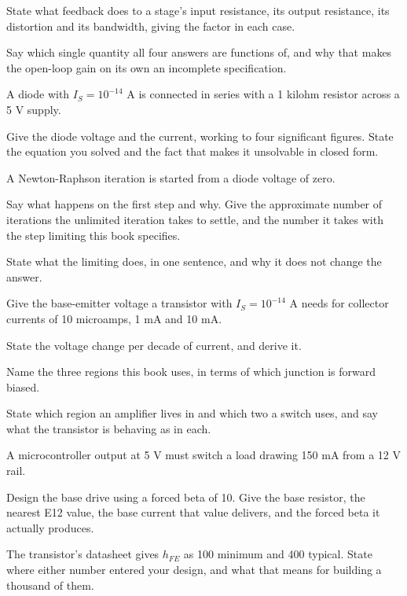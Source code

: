  State what feedback does to a stage's input resistance, its output resistance, its distortion and its bandwidth, giving the factor in each case.

Say which single quantity all four answers are functions of, and why that makes the open-loop gain on its own an incomplete specification.

 A diode with $I_S = 10^{-14}$ A is connected in series with a 1 kilohm resistor across a 5 V supply.

Give the diode voltage and the current, working to four significant figures. State the equation you solved and the fact that makes it unsolvable in closed form.

 A Newton-Raphson iteration is started from a diode voltage of zero.

Say what happens on the first step and why. Give the approximate number of iterations the unlimited iteration takes to settle, and the number it takes with the step limiting this book specifies.

State what the limiting does, in one sentence, and why it does not change the answer.

\label{exa:q:5}

 Give the base-emitter voltage a transistor with $I_S = 10^{-14}$ A needs for collector currents of 10 microamps, 1 mA and 10 mA.

State the voltage change per decade of current, and derive it.

 Name the three regions this book uses, in terms of which junction is forward biased.

State which region an amplifier lives in and which two a switch uses, and say what the transistor is behaving as in each.

 A microcontroller output at 5 V must switch a load drawing 150 mA from a 12 V rail.

Design the base drive using a forced beta of 10. Give the base resistor, the nearest E12 value, the base current that value delivers, and the forced beta it actually produces.

The transistor's datasheet gives $h_{FE}$ as 100 minimum and 400 typical. State where either number entered your design, and what that means for building a thousand of them.

